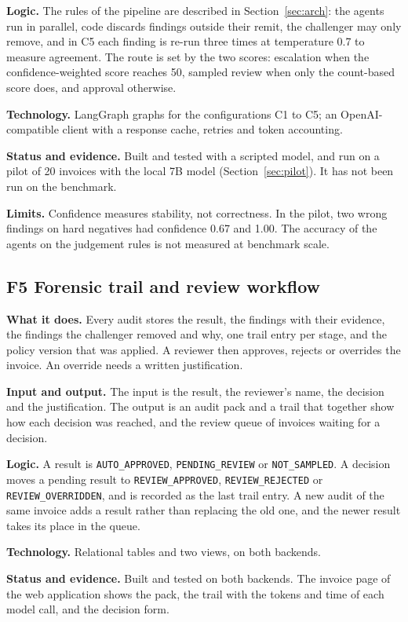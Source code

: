 \documentclass[11pt,a4paper]{article}
\begin{document}
\textbf{Logic.} The rules of the pipeline are described in Section~\ref{sec:arch}: the agents run in parallel, code discards findings outside their remit, the challenger may only remove, and in C5 each finding is re-run three times at temperature 0.7 to measure agreement. The route is set by the two scores: escalation when the confidence-weighted score reaches 50, sampled review when only the count-based score does, and approval otherwise.

\textbf{Technology.} LangGraph graphs for the configurations C1 to C5; an OpenAI-compatible client with a response cache, retries and token accounting.

\textbf{Status and evidence.} Built and tested with a scripted model, and run on a pilot of 20 invoices with the local 7B model (Section~\ref{sec:pilot}). It has not been run on the benchmark.

\textbf{Limits.} Confidence measures stability, not correctness. In the pilot, two wrong findings on hard negatives had confidence 0.67 and 1.00. The accuracy of the agents on the judgement rules is not measured at benchmark scale.

\subsection{F5 Forensic trail and review workflow}
\textbf{What it does.} Every audit stores the result, the findings with their evidence, the findings the challenger removed and why, one trail entry per stage, and the policy version that was applied. A reviewer then approves, rejects or overrides the invoice. An override needs a written justification.

\textbf{Input and output.} The input is the result, the reviewer's name, the decision and the justification. The output is an audit pack and a trail that together show how each decision was reached, and the review queue of invoices waiting for a decision.

\textbf{Logic.} A result is \texttt{AUTO\_APPROVED}, \texttt{PENDING\_REVIEW} or \texttt{NOT\_SAMPLED}. A decision moves a pending result to \texttt{REVIEW\_APPROVED}, \texttt{REVIEW\_REJECTED} or \texttt{REVIEW\_OVERRIDDEN}, and is recorded as the last trail entry. A new audit of the same invoice adds a result rather than replacing the old one, and the newer result takes its place in the queue.

\textbf{Technology.} Relational tables and two views, on both backends.

\textbf{Status and evidence.} Built and tested on both backends. The invoice page of the web application shows the pack, the trail with the tokens and time of each model call, and the decision form.
\end{document}
